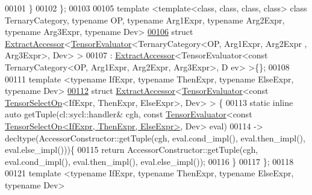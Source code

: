 \begin{DoxyCode}
00101   \}
00102 \};
00103 
00105 \textcolor{keyword}{template} <\textcolor{keyword}{template}<\textcolor{keyword}{class}, \textcolor{keyword}{class}, \textcolor{keyword}{class}, \textcolor{keyword}{class}> \textcolor{keyword}{class }TernaryCategory, \textcolor{keyword}{typename} OP, \textcolor{keyword}{typename} Arg1Expr, \textcolor{keyword}{
      typename} Arg2Expr, \textcolor{keyword}{typename} Arg3Expr, \textcolor{keyword}{typename} Dev>
\hyperlink{struct_eigen_1_1_tensor_sycl_1_1internal_1_1_extract_accessor_3_01_tensor_evaluator_3_01_ternaryb8a86dc87f8b1e563496a846ab6143f4}{00106} \textcolor{keyword}{struct }\hyperlink{struct_eigen_1_1_tensor_sycl_1_1internal_1_1_extract_accessor}{ExtractAccessor}<\hyperlink{struct_eigen_1_1_tensor_evaluator}{TensorEvaluator}<TernaryCategory<OP, Arg1Expr, Arg2Expr
      , Arg3Expr>, Dev> >
00107 : \hyperlink{struct_eigen_1_1_tensor_sycl_1_1internal_1_1_extract_accessor}{ExtractAccessor}<TensorEvaluator<const TernaryCategory<OP, Arg1Expr, Arg2Expr, Arg3Expr>, D
      ev> >\{\};
00108 
00111 \textcolor{keyword}{template} <\textcolor{keyword}{typename} IfExpr, \textcolor{keyword}{typename} ThenExpr, \textcolor{keyword}{typename} ElseExpr, \textcolor{keyword}{typename} Dev>
\hyperlink{struct_eigen_1_1_tensor_sycl_1_1internal_1_1_extract_accessor_3_01_tensor_evaluator_3_01const_015fb0e3d50888e2609204b1bb14cbb286}{00112} \textcolor{keyword}{struct }\hyperlink{struct_eigen_1_1_tensor_sycl_1_1internal_1_1_extract_accessor}{ExtractAccessor}<\hyperlink{struct_eigen_1_1_tensor_evaluator}{TensorEvaluator}<const 
      \hyperlink{class_eigen_1_1_tensor_select_op}{TensorSelectOp}<IfExpr, ThenExpr, ElseExpr>, Dev> > \{
00113   \textcolor{keyword}{static} \textcolor{keyword}{inline} \textcolor{keyword}{auto} getTuple(cl::sycl::handler& cgh, \textcolor{keyword}{const} \hyperlink{struct_eigen_1_1_tensor_evaluator}{TensorEvaluator}<\textcolor{keyword}{const} 
      \hyperlink{class_eigen_1_1_tensor_select_op}{TensorSelectOp<IfExpr, ThenExpr, ElseExpr>}, Dev> eval)
00114   -> decltype(AccessorConstructor::getTuple(cgh, eval.cond\_impl(), eval.then\_impl(), eval.else\_impl()))\{
00115     \textcolor{keywordflow}{return} AccessorConstructor::getTuple(cgh, eval.cond\_impl(), eval.then\_impl(), eval.else\_impl());
00116   \}
00117 \};
00118 
00121 \textcolor{keyword}{template} <\textcolor{keyword}{typename} IfExpr, \textcolor{keyword}{typename} ThenExpr, \textcolor{keyword}{typename} ElseExpr, \textcolor{keyword}{typename} Dev>

\end{DoxyCode}

